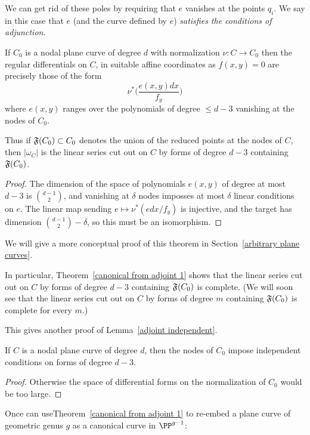 We can get rid of these poles by requiring that $e$ vanishes at the points $q_i$. We say in this case that $e$ (and the curve defined by $e$) \emph{satisfies the conditions of adjunction}. 

\begin{theorem}\label{canonical from adjoint 1}
If $C_{0}$ is a nodal plane curve of degree $d$ with normalization $\nu: C\to C_{0}$
then the  regular differentials on  $C$, in suitable affine coordinates as $f(x,y) = 0$ 
 are precisely those of the form
 $$
\nu^{*}\biggl( \frac{e(x,y)dx}{f_{y}}\biggr)
$$
where 
$e(x,y)$ ranges over the polynomials of degree $\leq d-3$
vanishing at the nodes of $C_{0}.$

Thus if $\adj(C_{0})\subset C_{0}$ denotes the union
of the reduced points at the nodes of $C$, then $|\omega_{C}|$ is the linear series cut out on $C$ by 
forms of degree $d-3$ containing $\adj(C_{0})$.
\end{theorem}

\begin{proof}
The dimension of the space of polynomials $e(x,y)$ of degree at most $d-3$ is $\binom{d-1}{2}$,
and vanishing at $\delta$ nodes imposses at most $\delta$ linear conditions on $e$. The linear map sending
$e\mapsto \nu^{*}(edx/f_{y})$ is injective, and the target has dimension 
$\binom{d-1}{2}-\delta$, so this must be an isomorphism.
\end{proof}
We will give a more conceptual proof of this theorem in Section~\ref{arbitrary plane curves}.

In particular, Theorem~\ref{canonical from adjoint 1}
shows that the linear series cut out on $C$ by 
forms of degree $d-3$ containing $\adj(C_{0})$ is complete. (We will soon see that
 the linear series cut out on $C$ by 
forms of degree $m$ containing $\adj(C_{0})$ is complete for every $m$.)


This gives another proof of Lemma~\ref{adjoint independent}.

\begin{corollary}
If $C$ is a nodal plane curve of degree $d$, then the nodes of $C_{0}$ impose independent
conditions on forms of degree $d-3$.
\end{corollary}
\begin{proof}
 Otherwise the space of differential forms on the normalization of $C_{0}$ would be too large.
\end{proof}

Once can useTheorem~\ref{canonical from adjoint 1} to re-embed a plane curve of 
geometric genus $g$ as a canonical
curve in $\PP^{g-1}$:

